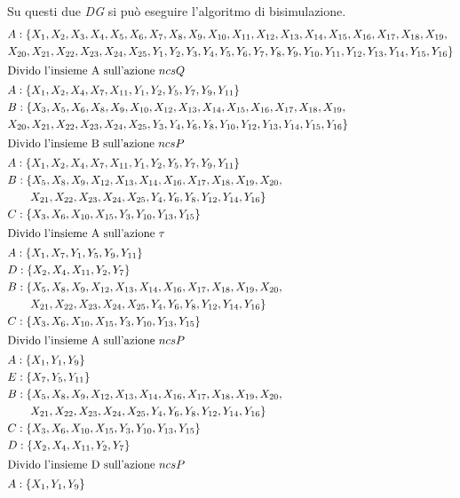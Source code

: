 \documentclass[a4paper]{article}
\begin{document}
Su questi due \textit{DG} si può eseguire l'algoritmo di bisimulazione.
\begin{align*}
	&A : \{X_1,X_2,X_3,X_4,X_5,X_6,X_7,X_8,X_9,X_{10},X_{11},X_{12},X_{13},X_{14},X_{15},X_{16},X_{17},X_{18},X_{19},
     \\ &X_{20},X_{21},X_{22},X_{23},X_{24},X_{25},Y_1,Y_2,Y_3,Y_4,Y_5,Y_6,Y_7,Y_8,Y_9,Y_{10},Y_{11},Y_{12},Y_{13},Y_{14},Y_{15},Y_{16}\}\\
     \intertext{Divido l'insieme A sull'azione $ncsQ$}
	&A: \{X_1,X_2,X_4,X_7,X_{11},Y_1,Y_2,Y_5,Y_7,Y_9,Y_{11}\}\\
	&B: \{X_3,X_5,X_6,X_8,X_9,X_{10},X_{12},X_{13},X_{14},X_{15},X_{16},X_{17},X_{18},X_{19},\\&X_{20},X_{21},X_{22},X_{23},X_{24},X_{25},Y_3,Y_4,Y_6,Y_8,Y_{10},Y_{12},Y_{13},Y_{14},Y_{15},Y_{16}\}\\
     \intertext{Divido l'insieme B sull'azione $ncsP$ }
	&A: \{X_1,X_2,X_4,X_7,X_{11},Y_1,Y_2,Y_5,Y_7,Y_9,Y_{11}\}\\
	&B: \{X_5,X_8,X_9,X_{12},X_{13},X_{14},X_{16},X_{17},X_{18},X_{19},X_{20},\\& \qquad X_{21},X_{22},X_{23},X_{24},X_{25},Y_4,Y_6,Y_8,Y_{12},Y_{14},Y_{16}\}\\
	&C: \{X_3,X_6,X_{10},X_{15},Y_3,Y_{10},Y_{13},Y_{15} \}\\
     \intertext{Divido l'insieme A sull'azione $\tau$ }
	&A: \{X_1,X_7,Y_1,Y_5,Y_9,Y_{11}\}\\
	&D: \{X_2,X_4,X_{11},Y_2,Y_7\}\\
	&B: \{X_5,X_8,X_9,X_{12},X_{13},X_{14},X_{16},X_{17},X_{18},X_{19},X_{20},\\& \qquad X_{21},X_{22},X_{23},X_{24},X_{25},Y_4,Y_6,Y_8,Y_{12},Y_{14},Y_{16}\}\\
	&C: \{X_3,X_6,X_{10},X_{15},Y_3,Y_{10},Y_{13},Y_{15} \}\\
     \intertext{Divido l'insieme A sull'azione $ncsP$ }
	&A: \{X_1,Y_1,Y_9\}\\
	&E: \{X_7,Y_5,Y_{11}\}\\
	&B: \{X_5,X_8,X_9,X_{12},X_{13},X_{14},X_{16},X_{17},X_{18},X_{19},X_{20},\\& \qquad X_{21},X_{22},X_{23},X_{24},X_{25},Y_4,Y_6,Y_8,Y_{12},Y_{14},Y_{16}\}\\
	&C: \{X_3,X_6,X_{10},X_{15},Y_3,Y_{10},Y_{13},Y_{15} \}\\
	&D: \{X_2,X_4,X_{11},Y_2,Y_7\}\\
     \intertext{Divido l'insieme D sull'azione $ncsP$ }
	&A: \{X_1,Y_1,Y_9\}\\

\end{align*}
\end{document}
